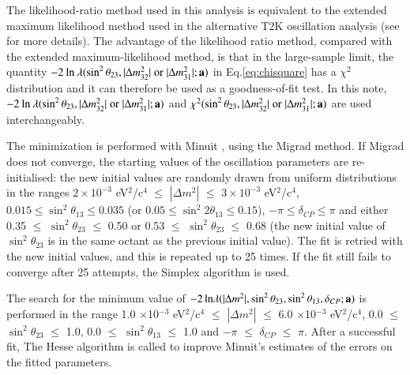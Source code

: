 The likelihood-ratio method used in this analysis is equivalent to the extended maximum likelihood
method used in the alternative T2K oscillation analysis 
(see \cite{OurRun1DisappAnalysis,StatAnalysisCowan} for more details).
The advantage of the likelihood ratio method, compared with the extended maximum-likelihood method, is that
in the large-sample limit, the quantity $-2 \: \textrm{ln} \: \lambda (\sin^{2}\theta_{23},|\Delta m^{2}_{32}| \; \textrm{or} \; |\Delta m^{2}_{31}|; {\bf a})$
in Eq.\ref{eq:chisquare} has a $\chi^{2}$ distribution and it can therefore be used as a goodness-of-fit test.
In this note,
$-2 \: \textrm{ln} \: \lambda (\sin^{2}\theta_{23},|\Delta m^{2}_{32}| \; \textrm{or} \; |\Delta m^{2}_{31}|; {\bf a})$ and
$\chi^{2}(\sin^{2}\theta_{23},|\Delta m^{2}_{32}| \; \textrm{or} \; |\Delta m^{2}_{31}|; {\bf a})$ are used interchangeably.

The minimization is performed with Minuit \cite{Minuit}, using the Migrad method.
If Migrad does not converge, the starting values of the oscillation parameters are re-initialised:
the new initial values are randomly drawn from uniform distributions in the ranges 
$2 \times 10^{-3}$ eV$^{2}$/c$^{4}$ $\leq$ $|\Delta m^{2}|$ $\leq$ $3 \times 10^{-3}$  eV$^{2}$/c$^{4}$,
$0.015 \leq \sin^{2}\theta_{13} \leq 0.035 $ (or $0.05 \leq \sin^{2}2\theta_{13} \leq 0.15 $), 
$-\pi \leq \delta_{CP} \leq \pi$ and
either 0.35 $\leq$ $\sin^{2}\theta_{23}$ $\leq$ 0.50 or 0.53 $\leq$ $\sin^{2}\theta_{23}$ $\leq$ 0.68 
(the new initial value of $\sin^{2}\theta_{23}$ is in the same octant as the previous initial value).  
The fit is retried with the new initial values, and this is repeated up to 25 times.
If the fit still fails to converge after 25 attempts, the Simplex algorithm is used.

The search for the minimum value of 
$-2 \, \textrm{ln} \lambda(|\Delta m^{2}|, \sin^{2}\theta_{23}, \sin^{2}\theta_{13}, \delta_{CP}; {\bf a})$
is performed in the range 
1.0 $\times$10$^{-3}$ eV$^{2}$/c$^{4}$ $\leq$ $|\Delta m^{2}|$ $\leq$ 6.0 $\times$10$^{-3}$ eV$^{2}$/c$^{4}$,
0.0 $\leq$ $\sin^{2}\theta_{23}$ $\leq$ 1.0,
0.0 $\leq$ $\sin^{2}\theta_{13}$ $\leq$ 1.0 and
$-\pi$ $\leq$ $\delta_{CP}$ $\leq$ $\pi$.
After a successful fit, The Hesse algorithm is called to improve Minuit's estimates of the
errors on the fitted parameters.

